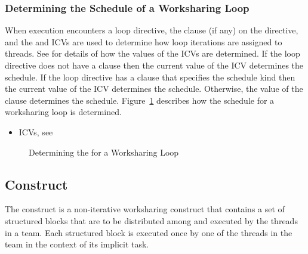 \subsubsection{Determining the Schedule of a Worksharing Loop}
\label{subsubsec:Determining the Schedule of a Worksharing Loop}
When execution encounters a loop directive, the  clause (if any) on the 
directive, and the  and  ICVs are used to determine how loop 
iterations are assigned to threads. See 
for details of how the 
values of the ICVs are determined. If the loop directive does not have a  
clause then the current value of the \mbox{} ICV determines the schedule. If the 
loop directive has a  clause that specifies the  schedule kind then 
the current value of the  ICV determines the schedule. Otherwise, the 
value of the  clause determines the schedule. Figure~\ref{fig:schedule loop}
describes how the schedule for a worksharing loop is determined.
\crossreferences

\begin{itemize}
\item ICVs, see 
\end{itemize}


\begin{figure}[h]
\begin{quote} %

\end{quote}
\caption{Determining the  for a Worksharing Loop\label{fig:schedule loop}}
\end{figure}











\subsection{ Construct}
\label{subsec:sections Construct}
\summary
The  construct is a non-iterative worksharing construct that contains a set of 
structured blocks that are to be distributed among and executed by the threads in a team. 
Each structured block is executed once by one of the threads in the team in the context 
of its implicit task.


